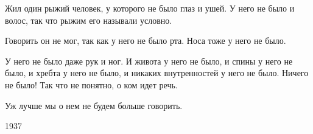 Жил один рыжий человек, у которого не
было глаз и ушей. У него не было и волос,
так что рыжим его называли условно.
    
Говорить он не мог, так как у него не
было рта. Носа тоже у него не было.
    
У него не было даже рук и ног. И живота
у него не было, и спины у него не было, и
хребта у него не было, и никаких внутренностей 
у него не было. Ничего не было! Так что
не понятно, о ком идет речь.
    
Уж лучше мы о нем не будем больше говорить.
\begin{flushright}
    1937
\end{flushright}                                  